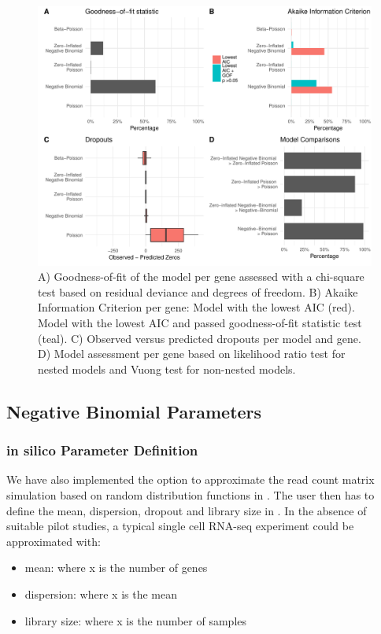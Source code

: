 \documentclass{article}\usepackage[]{graphicx}\usepackage[usenames,dvipsnames]{color}
\begin{document}
\begin{figure}[h]
\centering
\includegraphics[width=0.75\linewidth]{evaldist.pdf}
\caption{A) Goodness-of-fit of the model per gene assessed with a chi-square test based on residual deviance and degrees of freedom. B) Akaike Information Criterion per gene: Model with the lowest AIC (red). Model with the lowest AIC and passed goodness-of-fit statistic test (teal). C) Observed versus predicted dropouts per model and gene. D) Model assessment per gene based on likelihood ratio test for nested models and Vuong test for non-nested models.}
\label{fig:evaldist}
\end{figure}

\subsection{Negative Binomial Parameters}

\subsubsection{in silico Parameter Definition}

We have also implemented the option to approximate the read count matrix simulation based on random distribution functions in \R{}. The user then has to define the mean, dispersion, dropout and library size in . In the absence of suitable pilot studies, a typical single cell RNA-seq experiment could be approximated with:
\begin{itemize}
  \item mean:  where x is the number of genes
  \item dispersion:  where x is the mean
  \item library size:  where x is the number of samples
\end{itemize}
\end{document}
